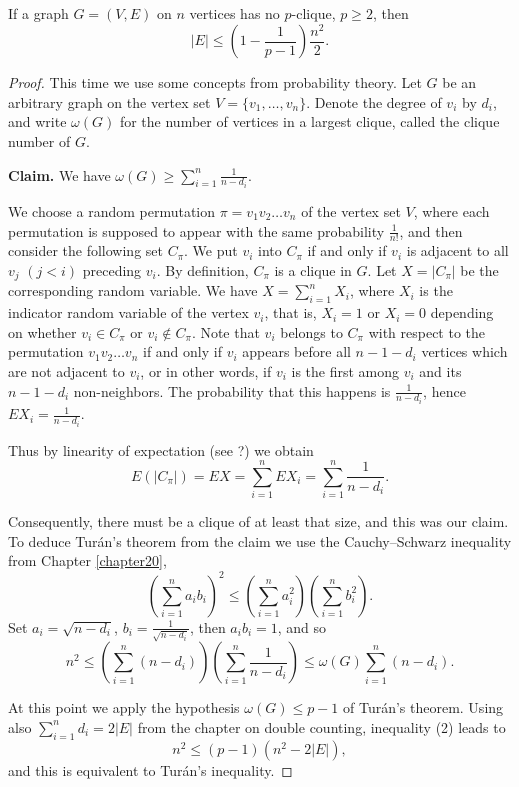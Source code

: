 \begin{theorem}
  \label{ch41proof4}
If a graph $G = (V, E)$ on $n$ vertices has no $p$-clique, $p \geq 2$, then
\[
|E| \leq \left(1 - \frac{1}{p - 1}\right) \frac{n^2}{2}. \tag{1}
\]
\end{theorem}
\begin{proof}
This time we use some concepts from probability theory. Let $G$ be an arbitrary graph on the vertex
set $V = \{v_1, \dots, v_n\}$. Denote the degree of $v_i$ by $d_i$, and write $\omega(G)$ for the
number of vertices in a largest clique, called the clique number of $G$.

\textbf{Claim.} We have $\omega(G) \geq \sum_{i=1}^n \frac{1}{n - d_i}$.

We choose a random permutation $\pi = v_1 v_2 \dots v_n$ of the vertex set $V$, where each
permutation is supposed to appear with the same probability $\frac{1}{n!}$, and then consider the
following set $C_{\pi}$. We put $v_i$ into $C_{\pi}$ if and only if $v_i$ is adjacent to all
$v_j$ $(j < i)$ preceding $v_i$. By definition, $C_{\pi}$ is a clique in $G$. Let $X = |C_{\pi}|$
be the corresponding random variable. We have $X = \sum_{i=1}^n X_i$, where $X_i$ is the indicator
random variable of the vertex $v_i$, that is, $X_i = 1$ or $X_i = 0$ depending on whether
$v_i \in C_{\pi}$ or $v_i \notin C_{\pi}$. Note that $v_i$ belongs to $C_{\pi}$ with respect to the
permutation $v_1 v_2 \dots v_n$ if and only if $v_i$ appears before all $n - 1 - d_i$ vertices which
are not adjacent to $v_i$, or in other words, if $v_i$ is the first among $v_i$ and its $n - 1 - d_i$
non-neighbors. The probability that this happens is $\frac{1}{n - d_i}$,
hence $E X_i = \frac{1}{n - d_i}$.

Thus by linearity of expectation (see ?) we obtain
\[
E(|C_{\pi}|) = E X = \sum_{i=1}^n E X_i = \sum_{i=1}^n \frac{1}{n - d_i}.
\]

Consequently, there must be a clique of at least that size, and this was our claim. To deduce
Turán’s theorem from the claim we use the Cauchy–Schwarz inequality from Chapter \ref{chapter20},
\[
\left( \sum_{i=1}^n a_i b_i \right)^2 \leq \left( \sum_{i=1}^n a_i^2 \right) \left( \sum_{i=1}^n b_i^2 \right).
\]
Set $a_i = \sqrt{n - d_i}$, $b_i = \frac{1}{\sqrt{n - d_i}}$, then $a_i b_i = 1$, and so
\[
n^2 \leq \left( \sum_{i=1}^n (n - d_i) \right) \left( \sum_{i=1}^n \frac{1}{n - d_i} \right) \leq \omega(G) \sum_{i=1}^n (n - d_i). \tag{2}
\]

At this point we apply the hypothesis $\omega(G) \leq p - 1$ of Turán’s theorem.
Using also $\sum_{i=1}^n d_i = 2|E|$ from the chapter on double counting, inequality (2) leads to
\[
n^2 \leq (p - 1)(n^2 - 2|E|),
\]
and this is equivalent to Turán’s inequality.
\end{proof}


